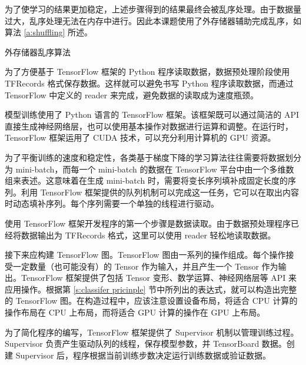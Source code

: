 为了使学习的结果更加稳定，上述步骤得到的结果最终会被乱序处理。由于数据量过大，乱序处理无法在内存中进行。因此本课题使用了外存储器辅助完成乱序，如算法 \ref{a:shuffling} 所述。

\begin{algorithm}[h]
	\caption{外存储器乱序算法}
	\label{a:shuffling}
\end{algorithm}

为了方便基于 TensorFlow 框架的 Python 程序读取数据，数据预处理阶段使用 TFRecords 格式保存数据。这样就可以避免书写 Python 程序读取数据，而通过 TensorFlow 中定义的 reader 来完成，避免数据的读取成为速度瓶颈。

\label{s:classifer training}
模型训练使用了 Python 语言的 TensorFlow 框架。该框架既可以通过简洁的 API 直接生成神经网络层，也可以使用基本操作对数据进行运算和调整。在运行时，TensorFlow 框架运用了 CUDA 技术，可以充分利用计算机的 GPU 资源。

为了平衡训练的速度和稳定性，各类基于梯度下降的学习算法往往需要将数据划分为 mini-batch，而每一个 mini-batch 的数据在 TensorFlow 平台中由一个多维数组来表述。这意味着在生成 mini-batch 时，需要将变长序列填补成固定长度的序列。利用 TensorFlow 框架提供的队列机制可以完成这一任务，它可以在取出内容时动态填补序列。每个序列需要一个单独的线程进行驱动。

使用 TensorFlow 框架开发程序的第一个步骤是数据读取。由于数据预处理程序已经将数据输出为 TFRecords 格式，这里可以使用 reader 轻松地读取数据。

接下来应构建 TensorFlow 图。TensorFlow 图由一系列的操作组成。每个操作接受一定数量（也可能没有）的 Tensor 作为输入，并且产生一个 Tensor 作为输出。TensorFlow 框架提供了包括 Tensor 变形、数学运算、神经网络层等 API 来应用操作。根据第 \ref{s:classifer pricinple} 节中所列出的表达式，就可以构造出完整的 TensorFlow 图。在构造过程中，应该注意设置设备布局，将适合 CPU 计算的操作布局在 CPU 上布局，而将适合 GPU 计算的操作在 GPU 上布局。

为了简化程序的编写，TensorFlow 框架提供了 Supervisor 机制以管理训练过程。Supervisor 负责产生驱动队列的线程，保存模型参数，并 TensorBoard 数据。创建 Supervisor 后，程序根据当前训练步数决定运行训练数据或验证数据。

